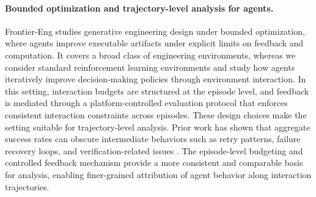 \paragraph{Bounded optimization and trajectory-level analysis for agents.}
Frontier-Eng studies generative engineering design under bounded optimization, where agents improve executable artifacts under explicit limits on feedback and computation\citep{frontiereng}. It covers a broad class of engineering environments, whereas we consider standard reinforcement learning environments and study how agents iteratively improve decision-making policies through environment interaction. In this setting, interaction budgets are structured at the episode level, and feedback is mediated through a platform-controlled evaluation protocol that enforces consistent interaction constraints across episodes. These design choices make the setting suitable for trajectory-level analysis. Prior work has shown that aggregate success rates can obscure intermediate behaviors such as retry patterns, failure recovery loops, and verification-related issues \citep{agentlens,codeagentbehavior,swechat,howcodingagentsfail}. The episode-level budgeting and controlled feedback mechanism provide a more consistent and comparable basis for analysis, enabling finer-grained attribution of agent behavior along interaction trajectories.


